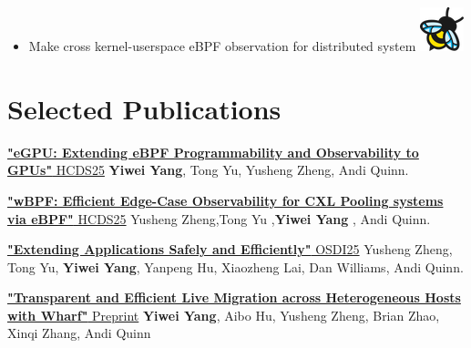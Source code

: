 \documentclass{resume}
\newcommand{\en}[1]{#1}
\newcommand{\zh}[1]{}
\begin{document}
\begin{itemize}
      \item \small{ \en{Make cross kernel-userspace eBPF observation for distributed system}
      \zh{设计一种基于用户态内核态eBPF协同工作的分布式系统。}}\includegraphics[width=\linewidth/40]{ebpf.png}
\end{itemize}

\section{\en{Selected Publications}\zh{主要论文}}

\href{https://dl.acm.org/doi/10.1145/3723851.3726984}{\textbf{"eGPU: Extending eBPF Programmability and Observability to GPUs"} HCDS25} \textbf{Yiwei Yang}, Tong Yu, Yusheng Zheng, Andi Quinn.

\href{https://dl.acm.org/doi/10.1145/3723851.3726985}{\textbf{"wBPF: Efficient Edge-Case Observability for CXL Pooling systems via eBPF"} HCDS25} Yusheng Zheng,Tong Yu ,\textbf{Yiwei Yang} , Andi Quinn.

\href{https://arxiv.org/pdf/2311.07923}{\textbf{"Extending Applications Safely and Efficiently"} OSDI25} Yusheng Zheng, Tong Yu, \textbf{Yiwei Yang}, Yanpeng Hu, Xiaozheng Lai, Dan Williams, Andi Quinn.

\href{https://arxiv.org/pdf/2410.15894}{\textbf{"Transparent and Efficient Live Migration across Heterogeneous Hosts with Wharf"} Preprint} \textbf{Yiwei Yang}, Aibo Hu, Yusheng Zheng, Brian Zhao, Xinqi Zhang, Andi Quinn
\end{document}
